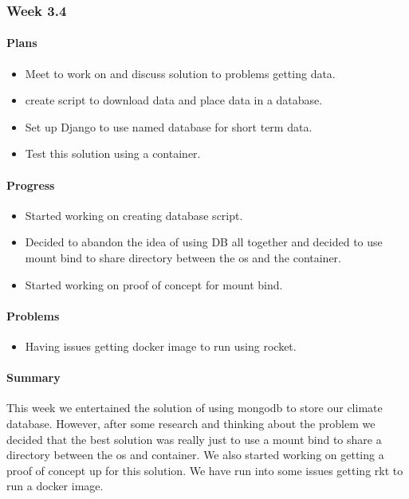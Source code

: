 \documentclass[onecolumn, draftclsnofoot,10pt, compsoc]{article}
\begin{document}
		\subsubsection{Week 3.4}
		    \paragraph{Plans} \hfill \break
		        \begin{itemize}
		            \item Meet to work on and discuss solution to problems getting data.\\
		            \item create script to download data and place data in a database.\\
		            \item Set up Django to use named database for short term data.\\
		            \item Test this solution using a container.\\
		        \end{itemize}
		    \paragraph{Progress} \hfill \break
		        \begin{itemize}
		            \item Started working on creating database script.\\
		            \item Decided to abandon the idea of using DB all together and decided to use mount bind to share directory between the os and the container.\\
		            \item Started working on proof of concept for mount bind.\\
		        \end{itemize}
		    \paragraph{Problems} \hfill \break
		        \begin{itemize}
		            \item Having issues getting docker image to run using rocket.\\
		        \end{itemize}
		    \paragraph{Summary} \hfill \break
		        This week we entertained the solution of using mongodb to store our climate database. However, after some research and thinking about the problem we decided that the best solution was really just to use a mount bind to share a directory between the os and container. We also started working on getting a proof of concept up for this solution. We have run into some issues getting rkt to run a docker image.\\
\end{document}
